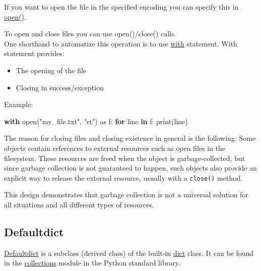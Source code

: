 \documentclass[
]{article}
\newenvironment{Shaded}{}{}
\newcommand{\BuiltInTok}[1]{#1}
\newcommand{\ControlFlowTok}[1]{\textcolor[rgb]{0.00,0.44,0.13}{\textbf{#1}}}
\newcommand{\ImportTok}[1]{#1}
\newcommand{\KeywordTok}[1]{\textcolor[rgb]{0.00,0.44,0.13}{\textbf{#1}}}
\newcommand{\NormalTok}[1]{#1}
\newcommand{\StringTok}[1]{\textcolor[rgb]{0.25,0.44,0.63}{#1}}
\begin{document}
If you want to open the file in the specified encoding you can specify
this in
\href{\%0Ahttps://docs.python.org/3/library/functions.html\#open}{open()}.

To open and close files you can use open()/close() calls. \\
One shorthand to automatize this operation is to use
\href{https://docs.python.org/3/reference/compound_stmts.html\#the-with-statement}{with}
statement. With statement provides:

\begin{itemize}
\item
  The opening of the file
\item
  Closing in success/exception
\end{itemize}

Example:

\begin{Shaded}
\begin{Highlighting}[]
\ControlFlowTok{with} \BuiltInTok{open}\NormalTok{(}\StringTok{"my\_file.txt"}\NormalTok{, }\StringTok{"rt"}\NormalTok{) }\ImportTok{as}\NormalTok{ f:}
  \ControlFlowTok{for}\NormalTok{ line }\KeywordTok{in}\NormalTok{ f:}
      \BuiltInTok{print}\NormalTok{(line)}
\end{Highlighting}
\end{Shaded}

The reason for closing files and closing existence in general is the
following: Some objects contain references to external resources such as
open files in the filesystem. These resources are freed when the object
is garbage-collected, but since garbage collection is not guaranteed to
happen, such objects also provide an explicit way to release the
external resource, usually with a \texttt{close()} method.

This design demonstrates that garbage collection is not a universal
solution for all situations and all different types of resources.

\hypertarget{defaultdict}{%
\subsection{Defaultdict}\label{defaultdict}}

\href{https://docs.python.org/3/library/collections.html\#collections.defaultdict}{Defaultdict}
is a subclass (derived class) of the built-in
\href{https://docs.python.org/3/library/stdtypes.html?highlight=dict\#dict}{dict}
class. It can be found in the
\href{https://docs.python.org/3/library/collections.html}{collections}
module in the Python standard library.
\end{document}
